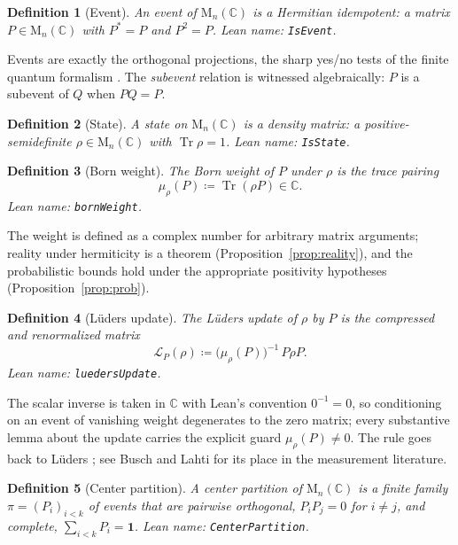 \documentclass[11pt]{article}
\renewcommand{\_}{\textunderscore\allowbreak}
\newtheorem{definition}{Definition}
\theoremstyle{remark}
\newcommand{\C}{\mathbb C}
\newcommand{\Mn}{\mathrm{M}_n(\C)}
\newcommand{\Tr}{\operatorname{Tr}}
\newcommand{\one}{\mathbf 1}
\newcommand{\lued}{\mathcal L}
\begin{document}
\begin{definition}[Event]
\label{def:event}
An \emph{event} of $\Mn$ is a Hermitian idempotent: a matrix $P \in \Mn$ with $P^{*} = P$ and $P^2 = P$. Lean name: \texttt{IsEvent}.
\end{definition}

Events are exactly the orthogonal projections, the sharp yes/no tests of the finite quantum formalism \cite{vonneumann1932}. The \emph{subevent} relation is witnessed algebraically: $P$ is a subevent of $Q$ when $PQ = P$.

\begin{definition}[State]
\label{def:state}
A \emph{state} on $\Mn$ is a density matrix: a positive-semidefinite $\rho \in \Mn$ with $\Tr \rho = 1$. Lean name: \texttt{IsState}.
\end{definition}

\begin{definition}[Born weight]
\label{def:bornweight}
The \emph{Born weight} of $P$ under $\rho$ is the trace pairing
\[
\mu_\rho(P) \coloneqq \Tr(\rho P) \in \C .
\]
Lean name: \texttt{bornWeight}.
\end{definition}

The weight is defined as a complex number for arbitrary matrix arguments; reality under hermiticity is a theorem (Proposition~\ref{prop:reality}), and the probabilistic bounds hold under the appropriate positivity hypotheses (Proposition~\ref{prop:prob}).

\begin{definition}[L\"uders update]
\label{def:lueders}
The \emph{L\"uders update} of $\rho$ by $P$ is the compressed and renormalized matrix
\[
\lued_P(\rho) \coloneqq \bigl(\mu_\rho(P)\bigr)^{-1}\, P \rho P .
\]
Lean name: \texttt{luedersUpdate}.
\end{definition}

The scalar inverse is taken in $\C$ with Lean's convention $0^{-1} = 0$, so conditioning on an event of vanishing weight degenerates to the zero matrix; every substantive lemma about the update carries the explicit guard $\mu_\rho(P) \neq 0$. The rule goes back to L\"uders \cite{lueders1950}; see Busch and Lahti \cite{buschlahti2009} for its place in the measurement literature.

\begin{definition}[Center partition]
\label{def:partition}
A \emph{center partition} of $\Mn$ is a finite family $\pi = (P_i)_{i < k}$ of events that are pairwise orthogonal, $P_i P_j = 0$ for $i \neq j$, and complete, $\sum_{i < k} P_i = \one$. Lean name: \texttt{CenterPartition}.
\end{definition}
\end{document}
